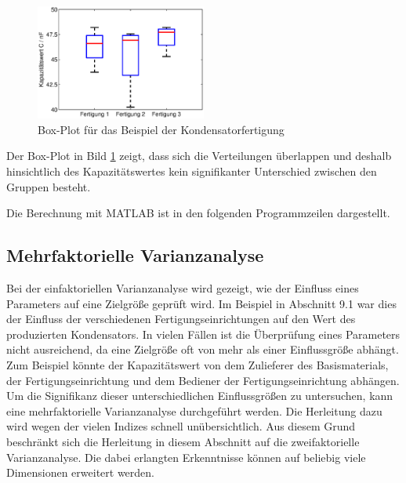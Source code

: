 \noindent 
\begin{figure}[H]
  \centerline{\includegraphics[width=0.5\textwidth]{Kapitel9/Bilder/image3}}
  \caption{Box-Plot f\"{u}r das Beispiel der Kondensatorfertigung}
  \label{fig:VarianzanalyseEinfachFertigung1}
\end{figure}

\noindent Der Box-Plot in Bild \ref{fig:VarianzanalyseEinfachFertigung1} zeigt, dass sich die Verteilungen \"{u}berlappen und deshalb hinsichtlich des Kapazit\"{a}tswertes kein signifikanter Unterschied zwischen den Gruppen besteht.\newline

\noindent Die Berechnung mit MATLAB ist in den folgenden Programmzeilen dargestellt.



\clearpage

\subsection{Mehrfaktorielle Varianzanalyse}

\noindent Bei der einfaktoriellen Varianzanalyse wird gezeigt, wie der Einfluss eines Parameters auf eine Zielgr\"{o}{\ss}e gepr\"{u}ft wird. Im Beispiel in Abschnitt 9.1 war dies der Einfluss der verschiedenen Fertigungseinrichtungen auf den Wert des produzierten Kondensators. In vielen F\"{a}llen ist die \"{U}berpr\"{u}fung eines Parameters nicht ausreichend, da eine Zielgr\"{o}{\ss}e oft von mehr als einer Einflussgr\"{o}{\ss}e abh\"{a}ngt. Zum Beispiel k\"{o}nnte der Kapazit\"{a}tswert von dem Zulieferer des Basismaterials, der Fertigungseinrichtung und dem Bediener der Fertigungseinrichtung abh\"{a}ngen. Um die Signifikanz dieser unterschiedlichen Einflussgr\"{o}{\ss}en zu untersuchen, kann eine mehrfaktorielle Varianzanalyse durchgef\"{u}hrt werden. Die Herleitung dazu wird wegen der vielen Indizes schnell un\"{u}bersichtlich. Aus diesem Grund beschr\"{a}nkt sich die Herleitung in diesem Abschnitt auf die zweifaktorielle Varianzanalyse. Die dabei erlangten Erkenntnisse k\"{o}nnen auf beliebig viele Dimensionen erweitert werden.

